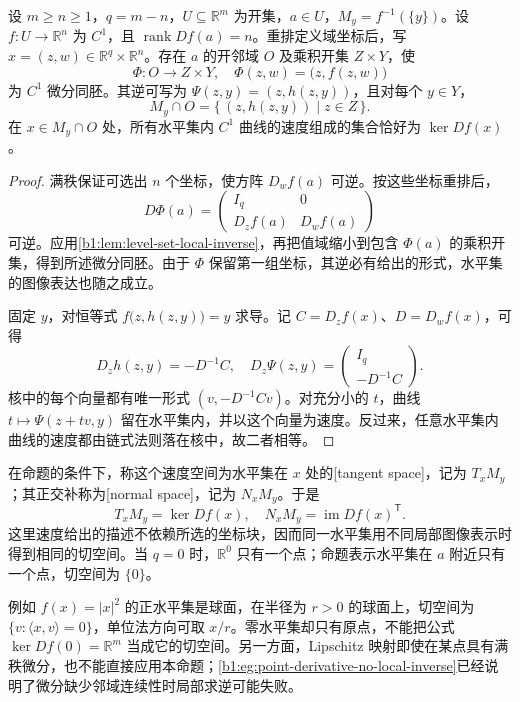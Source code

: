 \begin{proposition}[满秩水平集的局部坐标]
\label{b1:prop:regular-level-set}
设 \(m\ge n\ge1\)，\(q=m-n\)，\(U\subseteq\mathbb R^m\) 为开集，\(a\in U\)，\(M_y=f^{-1}(\{y\})\)。设 \(f:U\rightarrow\mathbb R^n\) 为 \(C^1\)，且 \(\operatorname{rank}Df(a)=n\)。重排定义域坐标后，写 \(x=(z,w)\in\mathbb R^q\times\mathbb R^n\)。存在 \(a\) 的开邻域 \(O\) 及乘积开集 \(Z\times Y\)，使
\[
 \Phi:O\longrightarrow Z\times Y,\quad
 \Phi(z,w)=\bigl(z,f(z,w)\bigr)
\]
为 \(C^1\) 微分同胚。其逆可写为 \(\Psi(z,y)=(z,h(z,y))\)，且对每个 \(y\in Y\)，
\[
 M_y\cap O=\{\,(z,h(z,y))\mid z\in Z\,\}.
\]
在 \(x\in M_y\cap O\) 处，所有水平集内 \(C^1\) 曲线的速度组成的集合恰好为 \(\ker Df(x)\)。
\end{proposition}
\begin{proof}
满秩保证可选出 \(n\) 个坐标，使方阵 \(D_wf(a)\) 可逆。按这些坐标重排后，
\[
 D\Phi(a)=
 \begin{pmatrix}I_q&0\\D_zf(a)&D_wf(a)\end{pmatrix}
\]
可逆。应用\cref{b1:lem:level-set-local-inverse}，再把值域缩小到包含 \(\Phi(a)\) 的乘积开集，得到所述微分同胚。由于 \(\Phi\) 保留第一组坐标，其逆必有给出的形式，水平集的图像表达也随之成立。

固定 \(y\)，对恒等式 \(f\bigl(z,h(z,y)\bigr)=y\) 求导。记 \(C=D_zf(x)\)、\(D=D_wf(x)\)，可得
\[
 D_zh(z,y)=-D^{-1}C,\quad
 D_z\Psi(z,y)=\begin{pmatrix}I_q\\-D^{-1}C\end{pmatrix}.
\]
核中的每个向量都有唯一形式 \((v,-D^{-1}Cv)\)。对充分小的 \(t\)，曲线 \(t\mapsto\Psi(z+tv,y)\) 留在水平集内，并以这个向量为速度。反过来，任意水平集内曲线的速度都由链式法则落在核中，故二者相等。
\end{proof}

在命题的条件下，称这个速度空间为水平集在 \(x\) 处的[tangent space]，记为 \(T_xM_y\)；其正交补称为[normal space]，记为 \(N_xM_y\)。于是
\[
 T_xM_y=\ker Df(x),\quad
 N_xM_y=\operatorname{im}Df(x)^{\mathsf T}.
\]
这里速度给出的描述不依赖所选的坐标块，因而同一水平集用不同局部图像表示时得到相同的切空间。当 \(q=0\) 时，\(\mathbb R^0\) 只有一个点；命题表示水平集在 \(a\) 附近只有一个点，切空间为 \(\{0\}\)。

\ProseParagraphBreak

例如 \(f(x)=|x|^2\) 的正水平集是球面，在半径为 \(r>0\) 的球面上，切空间为 \(\{v:\langle x,v\rangle=0\}\)，单位法方向可取 \(x/r\)。零水平集却只有原点，不能把公式 \(\ker Df(0)=\mathbb R^m\) 当成它的切空间。另一方面，Lipschitz 映射即使在某点具有满秩微分，也不能直接应用本命题；\cref{b1:eg:point-derivative-no-local-inverse}已经说明了微分缺少邻域连续性时局部求逆可能失败。


